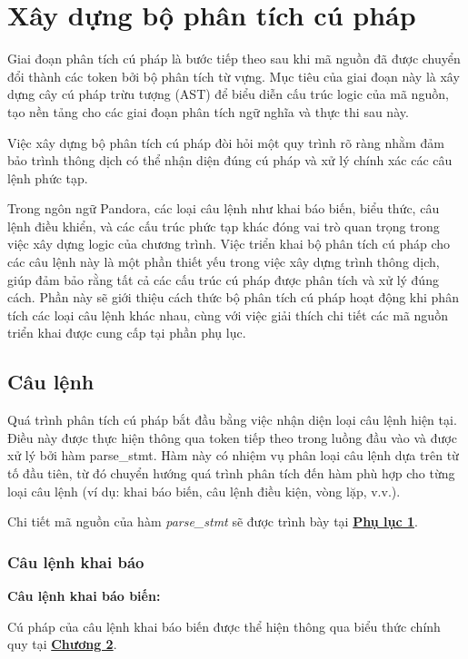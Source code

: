 \section{Xây dựng bộ phân tích cú pháp}
Giai đoạn phân tích cú pháp là bước tiếp theo sau khi mã nguồn đã được chuyển đổi thành các token bởi bộ phân tích từ vựng. Mục tiêu của giai đoạn này là xây dựng cây cú pháp trừu tượng (AST) để biểu diễn cấu trúc logic của mã nguồn, tạo nền tảng cho các giai đoạn phân tích ngữ nghĩa và thực thi sau này. 

Việc xây dựng bộ phân tích cú pháp đòi hỏi một quy trình rõ ràng nhằm đảm bảo trình thông dịch có thể nhận diện đúng cú pháp và xử lý chính xác các câu lệnh phức tạp.

Trong ngôn ngữ Pandora, các loại câu lệnh như khai báo biến, biểu thức, câu lệnh điều khiển, và các cấu trúc phức tạp khác đóng vai trò quan trọng trong việc xây dựng logic của chương trình. Việc triển khai bộ phân tích cú pháp cho các câu lệnh này là một phần thiết yếu trong việc xây dựng trình thông dịch, giúp đảm bảo rằng tất cả các cấu trúc cú pháp được phân tích và xử lý đúng cách. Phần này sẽ giới thiệu cách thức bộ phân tích cú pháp hoạt động khi phân tích các loại câu lệnh khác nhau, cùng với việc giải thích chi tiết các mã nguồn triển khai được cung cấp tại phần phụ lục.

\subsection{Câu lệnh}
Quá trình phân tích cú pháp bắt đầu bằng việc nhận diện loại câu lệnh hiện tại. Điều này được thực hiện thông qua token tiếp theo trong luồng đầu vào và được xử lý bởi hàm parse\_stmt. Hàm này có nhiệm vụ phân loại câu lệnh dựa trên từ tố đầu tiên, từ đó chuyển hướng quá trình phân tích đến hàm phù hợp cho từng loại câu lệnh (ví dụ: khai báo biến, câu lệnh điều kiện, vòng lặp, v.v.).

Chi tiết mã nguồn của hàm \textit{parse\_stmt} sẽ được trình bày tại \hyperref[ap1:stmt]{\bf Phụ lục 1}. %


\subsubsection{Câu lệnh khai báo}

\textbf{Câu lệnh khai báo biến:}

Cú pháp của câu lệnh khai báo biến được thể hiện thông qua biểu thức chính quy tại \hyperref[ch2:decl_var_stmt]{\bf Chương 2}.

